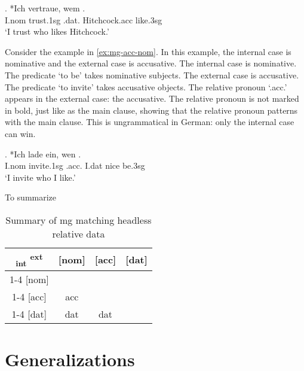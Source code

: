 \exg. *Ich vertraue, wem  .\\
I.\ac{nom} trust.1\ac{sg}\scsub{[dat]} .\ac{dat}. Hitchcock.\ac{acc} like.3\ac{sg}\scsub{[nom]}\\
`I trust who likes Hitchcock.' \label{ex:mg-dat-nom}

Consider the example in \ref{ex:mg-acc-nom}. In this example, the internal case is nominative and the external case is accusative.
The internal case is nominative. The predicate  `to be' takes nominative subjects.
The external case is accusative. The predicate  `to invite' takes accusative objects.
The relative pronoun  `.\ac{acc}.' appears in the external case: the accusative. The relative pronoun is not marked in bold, just like as the main clause, showing that the relative pronoun patterns with the main clause.
This is ungrammatical in German: only the internal case can win.

\exg. *Ich {lade ein}, wen   .\\
I.\ac{nom} invite.1\ac{sg}\scsub{[acc]} .\ac{acc}. I.\ac{dat} nice be.3\ac{sg}\scsub{[nom]}\\
`I invite who I like.' \label{ex:mg-acc-nom}

To summarize

\begin{table}[H]
  \center
  \caption {Summary of \ac{mg} matching headless relative data}
		\begin{tabular}{c|c|c|c}
		  \toprule
			\textsubscript{\ac{int}} \textsuperscript{\ac{ext}}
		        & [\ac{nom}]
		        & [\ac{acc}]
		        & [\ac{dat}]
		        \\ \cmidrule{1-4}
		    [\ac{nom}]
		        &
		        &
		        &
		        \\ \cmidrule{1-4}
		    [\ac{acc}]
		        & \ac{acc}
		        &
		        &
		        \\ \cmidrule{1-4}
		    [\ac{dat}]
		        & \ac{dat}
		        & \ac{dat}
		        &
		        \\
		  \bottomrule
		\end{tabular}
\end{table}







\section{Generalizations}

